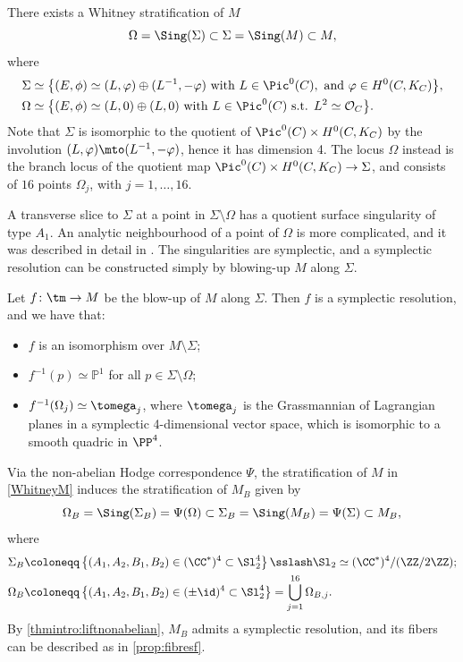 There exists a Whitney stratification of $M$
\begin{equation}\label{WhitneyM}
\Omega = \Sing(\Sigma) \subset\Sigma = \Sing(M) \subset M,
\end{equation}
where
\begin{align*}
\Sigma& \simeq \bigl\lbrace(E,\phi)\simeq (L,\varphi)\oplus (L^{-1},-\varphi) \text{ with }L\in \Pic^0(C),\text{ and }\varphi\in H^{0}(C, K_C)\bigr \rbrace,\\
\Omega& \simeq \bigl\lbrace(E,\phi)\simeq (L,0)\oplus (L,0) \text{ with }L\in \Pic^0(C)\text{ s.t. }L^2\simeq\mathcal{O}_C \bigr \rbrace.
\end{align*}
Note that $\Sigma$ is isomorphic to the quotient of $\Pic^0(C)\times H^0(C, K_C)$ by the involution $(L,\varphi)\mto (L^{-1},-\varphi)$, hence it has dimension 4. The locus $\Omega$ instead is the branch locus of the quotient map $\Pic^0(C)\times H^0(C, K_C) \to \Sigma$, and consists of $16$ points $\Omega_j$, with $j=1, \ldots, 16$.

A transverse slice to $\Sigma$ at a point in $\Sigma \setminus \Omega$ has a quotient surface singularity of type $A_1$. An analytic neighbourhood of a point of $\Omega$ is more complicated, and it was described in detail in \cite{LehnSorger2006}. The singularities are symplectic, and a symplectic resolution can be constructed simply by blowing-up $M$ along $\Sigma$.

\begin{prop}\label{prop:fibresf}
Let $f\colon \tm \to M$ be the blow-up of $M$ along $\Sigma$. Then $f$ is a symplectic resolution, and we have that:
\begin{itemize}
\item $f$ is an isomorphism over $M\setminus \Sigma$;
\item $f^{-1}(p)\simeq \mathbb{P}^1$ for all $p\in \Sigma\setminus \Omega$;
\item $f^{-1}(\Omega_j)\simeq \tomega_j$, where $\tomega_j$ is the Grassmannian of Lagrangian planes in a symplectic 4-dimensional vector space, which is isomorphic to a smooth quadric in $\PP^4$.
\end{itemize}
\end{prop}
Via the non-abelian Hodge correspondence $\Psi$, the stratification of $M$ in \eqref{WhitneyM} induces the stratification of $M_B$ given by
\begin{equation}\label{WhitneyMB}
\Omega_B = \Sing(\Sigma_B)=\Psi(\Omega) \subset\Sigma_B = \Sing(M_B) = \Psi(\Sigma) \subset M_B,
\end{equation}
where
\begin{align}
\Sigma_B &\coloneqq\left\lbrace (A_1, A_2, B_1, B_2) \in (\CC^*)^{4} \subset \Sl^{4}_2\right \rbrace\sslash \Sl_2 \simeq (\CC^*)^{ 4}/(\ZZ/2\ZZ); \label{descriptionSigmaB}\\
\Omega_B&\coloneqq\left\lbrace (A_1, A_2, B_1, B_2) \in (\pm \id)^{4} \subset \Sl^{ 4}_2\right \rbrace = \bigcup^{16}_{j=1}\Omega_{B, j}. \nonumber
\end{align}
By \cref{thmintro:liftnonabelian}, $M_B$ admits a symplectic resolution, and its fibers can be described as in \cref{prop:fibresf}.

